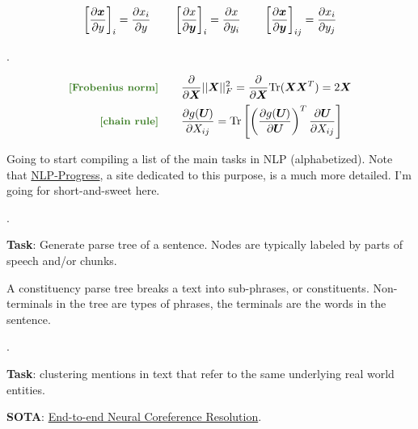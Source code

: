 \documentclass[11pt]{article}
\begin{document}

\begin{align}
	\left[ \frac{\partial \bm{x}_{}}{\partial y} \right]_i = \frac{\partial x_i}{\partial y}
	\qquad 
	\left[ \frac{\partial x}{\partial \bm{y}_{}} \right]_i = \frac{\partial x}{\partial y_i}
	\qquad
	\left[ \frac{\partial \bm{x}_{}}{\partial \bm{y}_{}} \right]_{ij} = \frac{\partial x_i}{\partial y_j}
\end{align}

.

\begin{align}
	\mtgreen{[Frobenius norm]}&
		\qquad
		\pderiv{}{\matr X} ||\matr X||_F^2 
			= \pderiv{}{\matr X} \text{Tr}(\matr X \matr X^T) = 2 \matr X \\
	\mtgreen{[chain rule]}&
		\qquad
		\pderiv{g(\matr U)}{X_{ij}}
			= \text{Tr}\left[  \left(  \pderiv{g(\matr U)}{\matr U} \right)^T \pderiv{\matr U}{X_{ij}} \right]
\end{align}




Going to start compiling a list of the main tasks in NLP (alphabetized). Note that \href{https://nlpprogress.com/}{NLP-Progress}, a site dedicated to this purpose, is a much more detailed. I'm going for short-and-sweet here.

\myspace
\p {}.
\begin{compactitem}
	\item \textbf{Task}: Generate parse tree of a sentence. Nodes are typically labeled by parts of speech and/or chunks. 
	\begin{compactitem}
		\item A constituency parse tree breaks a text into sub-phrases, or constituents. Non-terminals in the tree are types of phrases, the terminals are the words in the sentence. 
	\end{compactitem}
\end{compactitem}

\myspace
\p {}. 
\begin{compactitem}
	\item \textbf{Task}: clustering mentions in text that refer to the same underlying real world entities.
	
	\item \textbf{SOTA}: \href{https://arxiv.org/abs/1707.07045}{End-to-end Neural Coreference Resolution}. 
\end{compactitem}
\end{document}
